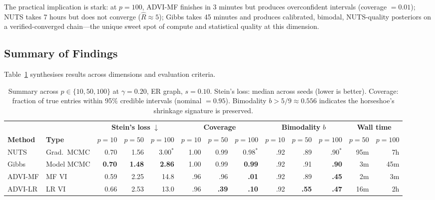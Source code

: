 \documentclass[10pt,conference,compsoc]{IEEEtran}
\begin{document}
The practical implication is stark: at $p{=}100$, ADVI-MF finishes in 3 minutes but produces overconfident intervals (coverage $= 0.01$); NUTS takes 7 hours but does not converge ($\hat{R}\approx 5$); Gibbs takes 45 minutes and produces calibrated, bimodal, NUTS-quality posteriors on a verified-converged chain---the unique sweet spot of compute and statistical quality at this dimension.

\subsection{Summary of Findings}

Table~\ref{tab:summary} synthesises results across dimensions and evaluation criteria.

\begin{table}[t]
\centering
\caption{Summary across $p \in \{10, 50, 100\}$ at $\gamma = 0.20$, ER graph, $s = 0.10$. Stein's loss: median across seeds (lower is better). Coverage: fraction of true entries within 95\% credible intervals (nominal $= 0.95$). Bimodality $b > 5/9 \approx 0.556$ indicates the horseshoe's shrinkage signature is preserved.}
\label{tab:summary}
\small
\begin{tabular}{@{}ll rrr rrr rrr rr@{}}
\toprule
& & \multicolumn{3}{c}{\textbf{Stein's loss} $\downarrow$} & \multicolumn{3}{c}{\textbf{Coverage}} & \multicolumn{3}{c}{\textbf{Bimodality} $b$} & \multicolumn{2}{c}{\textbf{Wall time}} \\
\cmidrule(lr){3-5} \cmidrule(lr){6-8} \cmidrule(lr){9-11} \cmidrule(lr){12-13}
\textbf{Method} & \textbf{Type} & \footnotesize $p{=}10$ & \footnotesize $p{=}50$ & \footnotesize $p{=}100$ & \footnotesize $p{=}10$ & \footnotesize $p{=}50$ & \footnotesize $p{=}100$ & \footnotesize $p{=}10$ & \footnotesize $p{=}50$ & \footnotesize $p{=}100$ & \footnotesize $p{=}50$ & \footnotesize $p{=}100$ \\
\midrule
NUTS      & Grad.\ MCMC & 0.70 & 1.56 & 3.00$^*$ & 1.00 & 0.99 & 0.98$^*$ & .92 & .89 & .90$^*$ & 95m  & 7h \\
Gibbs     & Model MCMC  & \textbf{0.70} & \textbf{1.48} & \textbf{2.86} & 1.00 & 0.99 & \textbf{0.99} & .92 & .91 & \textbf{.90} & 3m   & 45m \\
ADVI-MF   & MF VI       & 0.59  & 2.25  & 14.8   & .96 & .96 & \textbf{.01} & .92 & .89 & \textbf{.45} & 2m   & 3m \\
ADVI-LR   & LR VI       & 0.66  & 2.53  & 13.0   & .96 & \textbf{.39} & \textbf{.10} & .92 & \textbf{.55} & \textbf{.47} & 16m  & 2h \\

\end{tabular}
\end{table}
\end{document}
